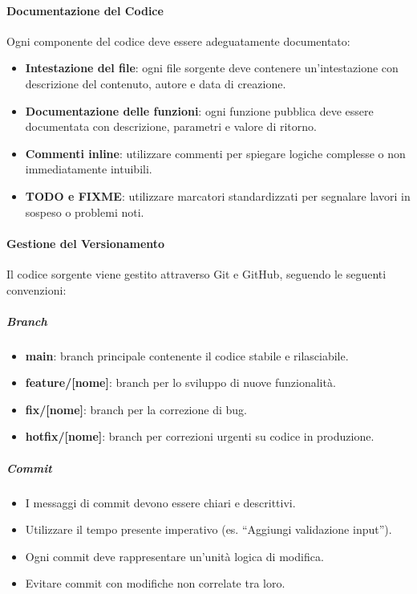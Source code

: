 \documentclass[a4paper, 11pt, oneside]{scrartcl} %
\begin{document}
\paragraph{Documentazione del Codice}
Ogni componente del codice deve essere adeguatamente documentato:
\begin{itemize}
    \item \textbf{Intestazione del file}: ogni file sorgente deve contenere un'intestazione con descrizione del contenuto, autore e data di creazione.
    \item \textbf{Documentazione delle funzioni}: ogni funzione pubblica deve essere documentata con descrizione, parametri e valore di ritorno.
    \item \textbf{Commenti inline}: utilizzare commenti per spiegare logiche complesse o non immediatamente intuibili.
    \item \textbf{TODO e FIXME}: utilizzare marcatori standardizzati per segnalare lavori in sospeso o problemi noti.
\end{itemize}

\paragraph{Gestione del Versionamento}
Il codice sorgente viene gestito attraverso Git{\scriptsize{}} e GitHub{\scriptsize{}}, seguendo le seguenti convenzioni:

\subparagraph{Branch}
\begin{itemize}
    \item \textbf{main}: branch principale contenente il codice stabile e rilasciabile.
    \item \textbf{feature/[nome]}: branch per lo sviluppo di nuove funzionalità.
    \item \textbf{fix/[nome]}: branch per la correzione di bug.
    \item \textbf{hotfix/[nome]}: branch per correzioni urgenti su codice in produzione.
\end{itemize}

\subparagraph{Commit}
\begin{itemize}
    \item I messaggi di commit{\scriptsize{}} devono essere chiari e descrittivi.
    \item Utilizzare il tempo presente imperativo (es. ``Aggiungi validazione input'').
    \item Ogni commit deve rappresentare un'unità logica di modifica.
    \item Evitare commit con modifiche non correlate tra loro.
\end{itemize}
\end{document}
